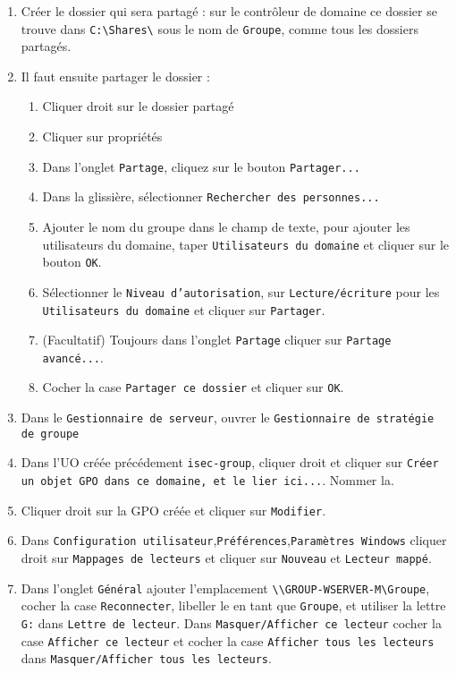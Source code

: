 				\begin{enumerate}
					\item Créer le dossier qui sera partagé : sur le contrôleur de domaine ce dossier se trouve dans \texttt{C:\textbackslash{}Shares\textbackslash}  sous le nom de \texttt{Groupe}, comme tous les dossiers partagés.
					\item Il faut ensuite partager le dossier : 
						\begin{enumerate}
							\item Cliquer droit sur le dossier partagé
							\item Cliquer sur propriétés
							\item Dans l'onglet \texttt{Partage}, cliquez sur le bouton \texttt{Partager...}
							\item Dans la glissière, sélectionner \texttt{Rechercher des personnes...}
							\item Ajouter le nom du groupe dans le champ de texte, pour ajouter les utilisateurs du domaine, taper \texttt{Utilisateurs du domaine} et cliquer sur le bouton \texttt{OK}.
							\item Sélectionner le \texttt{Niveau d'autorisation}, sur \texttt{Lecture/écriture} pour les \texttt{Utilisateurs du domaine} et cliquer sur \texttt{Partager}.
							\item (Facultatif) Toujours dans l'onglet \texttt{Partage} cliquer sur \texttt{Partage avancé...}.
							\item Cocher la case \texttt{Partager ce dossier} et cliquer sur \texttt{OK}.
						\end{enumerate}  
						\item Dans le \texttt{Gestionnaire de serveur}, ouvrer le \texttt{Gestionnaire de stratégie de groupe}
						\item Dans l'UO créée précédement \texttt{isec-group}, cliquer droit et cliquer sur \texttt{Créer un objet GPO dans ce domaine, et le lier ici...}. Nommer la. 
						\item Cliquer droit sur la GPO créée et cliquer sur \texttt{Modifier}.
						\item Dans \texttt{Configuration utilisateur},\texttt{Préférences},\texttt{Paramètres Windows} cliquer droit sur \texttt{Mappages de lecteurs} et cliquer sur \texttt{Nouveau} et \texttt{Lecteur mappé}.
						\item Dans l'onglet \texttt{Général} ajouter l'emplacement \texttt{\textbackslash{}\textbackslash{}GROUP-WSERVER-M\textbackslash{}Groupe}, cocher la case \texttt{Reconnecter}, libeller le en tant que \texttt{Groupe}, et utiliser la lettre \texttt{G:} dans \texttt{Lettre de lecteur}. Dans \texttt{Masquer/Afficher ce lecteur} cocher la case \texttt{Afficher ce lecteur} et cocher la case \texttt{Afficher tous les lecteurs} dans \texttt{Masquer/Afficher tous les lecteurs}.

\end{enumerate}
